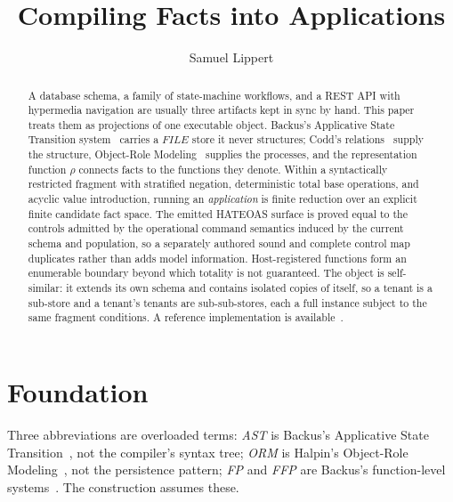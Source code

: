 \documentclass[10pt,twocolumn]{article}
\title{\textbf{Compiling Facts into Applications}}
\author{Samuel Lippert}
\date{}
\theoremstyle{plain}
\theoremstyle{definition}
\begin{document}
\maketitle

\begin{abstract}
A database schema, a family of state-machine workflows, and a REST API with hypermedia navigation are usually three artifacts kept in sync by hand. This paper treats them as projections of one executable object. Backus's Applicative State Transition system~\cite{backus78} carries a $\mathit{FILE}$ store it never structures; Codd's relations~\cite{codd70} supply the structure, Object-Role Modeling~\cite{halpin08} supplies the processes, and the representation function $\rho$ connects facts to the functions they denote. Within a syntactically restricted fragment with stratified negation, deterministic total base operations, and acyclic value introduction, running an \emph{application} is finite reduction over an explicit finite candidate fact space. The emitted HATEOAS surface is proved equal to the controls admitted by the operational command semantics induced by the current schema and population, so a separately authored sound and complete control map duplicates rather than adds model information. Host-registered functions form an enumerable boundary beyond which totality is not guaranteed. The object is self-similar: it extends its own schema and contains isolated copies of itself, so a tenant is a sub-store and a tenant's tenants are sub-sub-stores, each a full instance subject to the same fragment conditions. A reference implementation is available~\cite{arest}.
\end{abstract}


\section{Foundation}\label{sec:foundation}

Three abbreviations are overloaded terms: \emph{AST} is Backus's Applicative State Transition~\cite[Sec.\,14]{backus78}, not the compiler's syntax tree; \emph{ORM} is Halpin's Object-Role Modeling~\cite{halpin08}, not the persistence pattern; \emph{FP} and \emph{FFP} are Backus's function-level systems~\cite[Secs.\,11,\,13]{backus78}. The construction assumes these.
\end{document}
